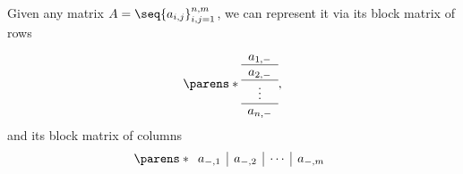 \begin{definition}
  Given any matrix \( A = \seq{ a_{i,j} }_{i,j=1}^{n,m} \), we can represent it via its block matrix of rows
  \begin{equation*}
    \parens*
      {
        \begin{array}{c}
          a_{1,\anon*} \\
          \hline
          a_{2,\anon*} \\
          \hline
          \vdots \\
          \hline
          a_{n,\anon*}
        \end{array}
      },
  \end{equation*}
  and its block matrix of columns
  \begin{equation*}
    \parens*
      {
        \begin{array}{c|c|c|c}
          a_{\anon*,1} & a_{\anon*,2} & \cdots & a_{\anon*,m}
        \end{array}
      }
  \end{equation*}
\end{definition}

